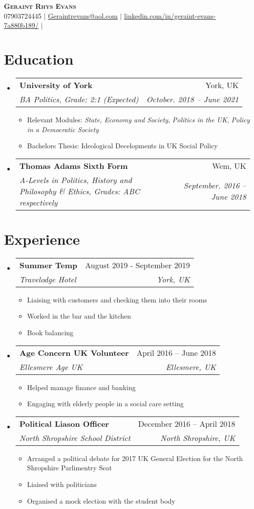 \documentclass[letterpaper,11pt]{article}
\makeatletter
\newcommand{\resumeItem}[1]{
  \item\small{
    {#1 \vspace{-2pt}}
  }
}
\newcommand{\resumeSubheading}[4]{
  \vspace{-2pt}\item
    \begin{tabular*}{0.97\textwidth}[t]{l@{\extracolsep{\fill}}r}
      \textbf{#1} & #2 \\
      \textit{\small#3} & \textit{\small #4} \\
    \end{tabular*}\vspace{-7pt}
}
\newcommand{\resumeSubHeadingListStart}{\begin{itemize}[leftmargin=0.15in, label={}]}
\newcommand{\resumeSubHeadingListEnd}{\end{itemize}}
\newcommand{\resumeItemListStart}{\begin{itemize}}
\newcommand{\resumeItemListEnd}{\end{itemize}\vspace{-5pt}}
\makeatother
\begin{document}
\begin{center}
    \textbf{\Huge \scshape Geraint Rhys Evans} \\ \vspace{5pt}
    \small 07903724445 $|$ \href{mailto:x@x.com}{\underline{Geraintrevans@aol.com}} $|$ 
    \href{https://www.linkedin.com/in/geraint-evans-7a880b189/}{\underline{linkedin.com/in/geraint-evans-7a880b189/}} $|$
\end{center}


\section{Education}
  \resumeSubHeadingListStart
    \resumeSubheading
      {University of York}{York, UK}
      {BA Politics, Grade: 2:1 (Expected)}{October. 2018 -- June 2021}
        \resumeItemListStart
        \resumeItem{Relevant Modules: \textit{State, Economy and Society}, \textit{Politics in the UK}, \textit{Policy in a Democratic Society} }
        \resumeItem{Bachelors Thesis: Ideological Decelopments in UK Social Policy}
        \resumeItemListEnd
    \resumeSubheading
      {Thomas Adams Sixth Form}{Wem, UK}
      {A-Levels in Politics, History and Philosophy \& Ethics, Grades: ABC respectively}{September. 2016 -- June 2018}
  \resumeSubHeadingListEnd


\section{Experience}
  \resumeSubHeadingListStart

    \resumeSubheading
    {Summer Temp}{August 2019 - September 2019}
      {Travelodge Hotel}{York, UK}
      \resumeItemListStart
        \resumeItem{Liaising with customers and checking them into their rooms}
        \resumeItem{Worked in the bar and the kitchen}
        \resumeItem{Book balancing}  
    \resumeItemListEnd


    \resumeSubheading
    {Age Concern UK Volunteer}{April 2016 -- June 2018}
     {Ellesmere Age UK}{Ellesmere, UK}
     \resumeItemListStart   
        \resumeItem{Helped manage finance and banking}
        \resumeItem{Engaging with elderly people in a social care setting}
     \resumeItemListEnd

    \resumeSubheading
    {Political Liason Officer}{December 2016 -- April 2018}
    {North Shropshire School District}{North Shropshire, UK}
    \resumeItemListStart
        \resumeItem{Arranged a political debate for 2017 UK General Election for the North Shropshire Parlimentry Seat}
        \resumeItem{Liaised with politicians}
        \resumeItem{Organised a mock election with the student body}
    \resumeItemListEnd
 \resumeSubHeadingListEnd
\end{document}
